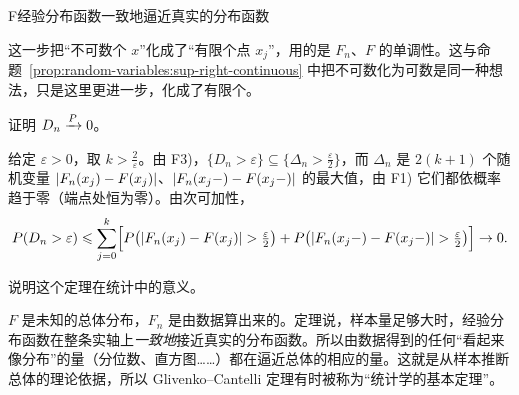 \begin{probleme}{F}{经验分布函数一致地逼近真实的分布函数}
\begin{questions}
\begin{solution}
这一步把“不可数个 $x$”化成了“有限个点 $x_j$”，用的是 $F_n$、$F$ 的单调性。这与命题~\ref{prop:random-variables:sup-right-continuous} 中把不可数化为可数是同一种想法，只是这里更进一步，化成了有限个。
\end{solution}
\item 证明 $D_n\xrightarrow{P}0$。
\begin{solution}
给定 $\varepsilon>0$，取 $k>\frac2\varepsilon$。由 F3)，$\{D_n>\varepsilon\}\subseteq\{\Delta_n>\frac\varepsilon2\}$，而 $\Delta_n$ 是 $2(k+1)$ 个随机变量 $\lvert F_n(x_j)-F(x_j)\rvert$、$\lvert F_n(x_j-)-F(x_j-)\rvert$ 的最大值，由 F1) 它们都依概率趋于零（端点处恒为零）。由次可加性，
\[
P(D_n>\varepsilon)\leqslant\sum_{j=0}^k\Bigl[P\bigl(\lvert F_n(x_j)-F(x_j)\rvert>\tfrac\varepsilon2\bigr)+P\bigl(\lvert F_n(x_j-)-F(x_j-)\rvert>\tfrac\varepsilon2\bigr)\Bigr]\to0 .
\]
\end{solution}
\item 说明这个定理在统计中的意义。
\begin{solution}
$F$ 是未知的总体分布，$F_n$ 是由数据算出来的。定理说，样本量足够大时，经验分布函数在整条实轴上\emph{一致地}接近真实的分布函数。所以由数据得到的任何“看起来像分布”的量（分位数、直方图……）都在逼近总体的相应的量。这就是从样本推断总体的理论依据，所以 Glivenko--Cantelli 定理有时被称为“统计学的基本定理”。
\end{solution}
\end{questions}
\end{probleme}
